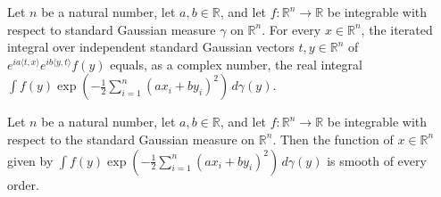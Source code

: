\begin{lemma}
\label{BooleanAnalysis.GaussianSpace.integral_gaussian_double_phase}
\leanok
{}
Let $n$ be a natural number, let $a,b\in\mathbb R$, and let $f:\mathbb R^n\to\mathbb R$
be integrable with respect to standard Gaussian measure $\gamma$ on $\mathbb R^n$. For
every $x\in\mathbb R^n$, the iterated integral over independent standard Gaussian
vectors $t,y\in\mathbb R^n$ of $e^{ia\langle t,x\rangle}e^{ib\langle y,t\rangle}f(y)$
equals, as a complex number, the real integral $\int
f(y)\exp\!\left(-\frac12\sum_{i=1}^n(a x_i+b y_i)^2\right)\,d\gamma(y)$.
\end{lemma}

\begin{lemma}
\label{BooleanAnalysis.GaussianSpace.contDiff_integral_gaussian_exp}
\leanok
{}
Let $n$ be a natural number, let $a,b\in\mathbb R$, and let $f:\mathbb R^n\to\mathbb R$
be integrable with respect to the standard Gaussian measure on $\mathbb R^n$. Then the
function of $x\in\mathbb R^n$ given by $\int f(y)\exp\!\left(-\frac12\sum_{i=1}^n(a
x_i+b y_i)^2\right)\,d\gamma(y)$ is smooth of every order.
\end{lemma}
